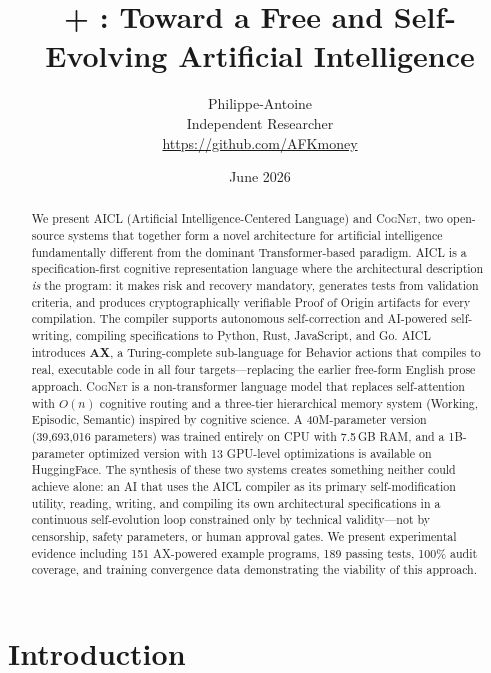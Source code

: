 \documentclass[11pt]{article}
\title{\aicl{} + \cognet{}: Toward a Free and Self-Evolving Artificial Intelligence}
\author{
  Philippe-Antoine \\[4pt]
  \small Independent Researcher \\[2pt]
  \small \url{https://github.com/AFKmoney}
}
\date{June 2026}
\newcommand{\aicl}{\textsc{AICL}}
\newcommand{\cognet}{\textsc{CogNet}}
\newcommand{\proofoforigin}{Proof of Origin}
\begin{document}

\maketitle

\begin{abstract}
We present \aicl{} (Artificial Intelligence-Centered Language) and \cognet{}, two open-source systems that together form a novel architecture for artificial intelligence fundamentally different from the dominant Transformer-based paradigm. \aicl{} is a specification-first cognitive representation language where the architectural description \emph{is} the program: it makes risk and recovery mandatory, generates tests from validation criteria, and produces cryptographically verifiable \proofoforigin{} artifacts for every compilation. The compiler supports autonomous self-correction and AI-powered self-writing, compiling specifications to Python, Rust, JavaScript, and Go. \aicl{} introduces \textbf{AX}, a Turing-complete sub-language for Behavior actions that compiles to real, executable code in all four targets---replacing the earlier free-form English prose approach. \cognet{} is a non-transformer language model that replaces self-attention with $O(n)$ cognitive routing and a three-tier hierarchical memory system (Working, Episodic, Semantic) inspired by cognitive science. A 40M-parameter version (39,693,016 parameters) was trained entirely on CPU with 7.5\,GB RAM, and a 1B-parameter optimized version with 13 GPU-level optimizations is available on HuggingFace. The synthesis of these two systems creates something neither could achieve alone: an AI that uses the \aicl{} compiler as its primary self-modification utility, reading, writing, and compiling its own architectural specifications in a continuous self-evolution loop constrained only by technical validity---not by censorship, safety parameters, or human approval gates. We present experimental evidence including 151 AX-powered example programs, 189 passing tests, 100\% audit coverage, and training convergence data demonstrating the viability of this approach.
\end{abstract}

\section{Introduction}
\label{sec:introduction}
\end{document}
